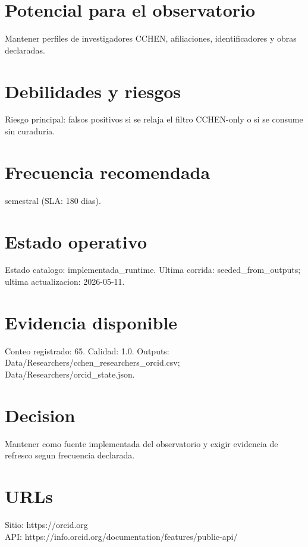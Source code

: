 \documentclass[10pt,a4paper]{article}
\begin{document}
\section*{Potencial para el observatorio}
Mantener perfiles de investigadores CCHEN, afiliaciones, identificadores y obras declaradas.

\section*{Debilidades y riesgos}
Riesgo principal: falsos positivos si se relaja el filtro CCHEN-only o si se consume sin curaduria.

\section*{Frecuencia recomendada}
semestral (SLA: 180 dias).

\section*{Estado operativo}
Estado catalogo: implementada\_runtime. Ultima corrida: seeded\_from\_outputs; ultima actualizacion: 2026-05-11.

\section*{Evidencia disponible}
Conteo registrado: 65. Calidad: 1.0. Outputs: Data/Researchers/cchen\_researchers\_orcid.csv; Data/Researchers/orcid\_state.json.

\section*{Decision}
Mantener como fuente implementada del observatorio y exigir evidencia de refresco segun frecuencia declarada.


\section*{URLs}
Sitio: https://orcid.org\\
API: https://info.orcid.org/documentation/features/public-api/
\end{document}
